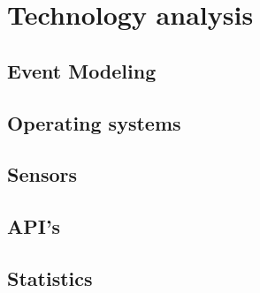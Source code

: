 \chapter{Technology analysis}




\section{Event Modeling}


\section{Operating systems}


\section{Sensors}


\section{API's}
\label{api}


\section{Statistics}
